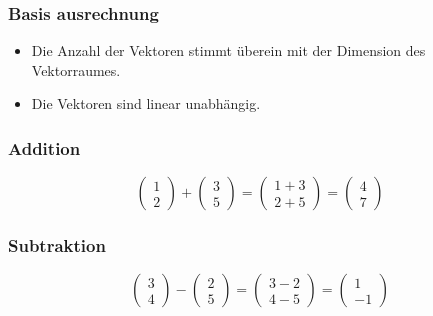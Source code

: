 \documentclass[11pt]{article}
\begin{document}
		\subsubsection{Basis ausrechnung}
			\begin{itemize}
				\item Die Anzahl der Vektoren stimmt überein mit der Dimension des Vektorraumes.
				\item Die Vektoren sind linear unabhängig.
			\end{itemize}
		\subsubsection{Addition}
		\[	\left(\begin{array}{c}
				1\\ 
				2
			\end{array} \right) + \left(\begin{array}{c}
			3\\ 
			5
		\end{array} \right) =	\left(\begin{array}{c}
		1 + 3\\ 
		2 + 5
	\end{array} \right) = \left(\begin{array}{c}
	4\\ 
	7
\end{array} \right) \]
		\subsubsection{Subtraktion}
		\[	\left(\begin{array}{c}
				3\\ 
				4
			\end{array} \right) - \left(\begin{array}{c}
			2\\ 
			5
		\end{array} \right) =
	\left(\begin{array}{c}
		3 - 2\\ 
		4 - 5
	\end{array} \right) = \left(\begin{array}{c}
	1\\ 
	-1
\end{array} \right) \]
\end{document}
